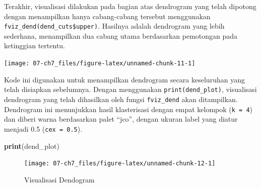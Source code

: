 \documentclass[
  oneside]{book}
\newenvironment{Shaded}{\begin{snugshade}}{\end{snugshade}}
\newcommand{\AttributeTok}[1]{\textcolor[rgb]{0.13,0.29,0.53}{#1}}
\newcommand{\DecValTok}[1]{\textcolor[rgb]{0.00,0.00,0.81}{#1}}
\newcommand{\FloatTok}[1]{\textcolor[rgb]{0.00,0.00,0.81}{#1}}
\newcommand{\FunctionTok}[1]{\textcolor[rgb]{0.13,0.29,0.53}{\textbf{#1}}}
\newcommand{\NormalTok}[1]{#1}
\newcommand{\OtherTok}[1]{\textcolor[rgb]{0.56,0.35,0.01}{#1}}
\newcommand{\SpecialCharTok}[1]{\textcolor[rgb]{0.81,0.36,0.00}{\textbf{#1}}}
\newcommand{\StringTok}[1]{\textcolor[rgb]{0.31,0.60,0.02}{#1}}
\begin{document}
Terakhir, visualisasi dilakukan pada bagian atas dendrogram yang telah dipotong dengan menampilkan hanya cabang-cabang tersebut menggunakan \texttt{fviz\_dend(dend\_cuts\$upper)}. Hasilnya adalah dendrogram yang lebih sederhana, menampilkan dua cabang utama berdasarkan pemotongan pada ketinggian tertentu.

\begin{Shaded}
\end{Shaded}

\begin{center}\texttt{[image: 07-ch7\_files/figure-latex/unnamed-chunk-11-1]} \end{center}

Kode ini digunakan untuk menampilkan dendrogram secara keseluruhan yang telah disiapkan sebelumnya. Dengan menggunakan \texttt{print(dend\_plot)}, visualisasi dendrogram yang telah dihasilkan oleh fungsi \texttt{fviz\_dend} akan ditampilkan. Dendrogram ini menunjukkan hasil klasterisasi dengan empat kelompok (\texttt{k\ =\ 4}) dan diberi warna berdasarkan palet ``jco'', dengan ukuran label yang diatur menjadi 0.5 (\texttt{cex\ =\ 0.5}).

\begin{Shaded}
\begin{Highlighting}[]
\FunctionTok{print}\NormalTok{(dend\_plot)}
\end{Highlighting}
\end{Shaded}

\begin{figure}[h]

{\centering \texttt{[image: 07-ch7\_files/figure-latex/unnamed-chunk-12-1]} 

}

\caption{Visualisasi Dendogram}\label{fig:unnamed-chunk-12}
\end{figure}
\end{document}
